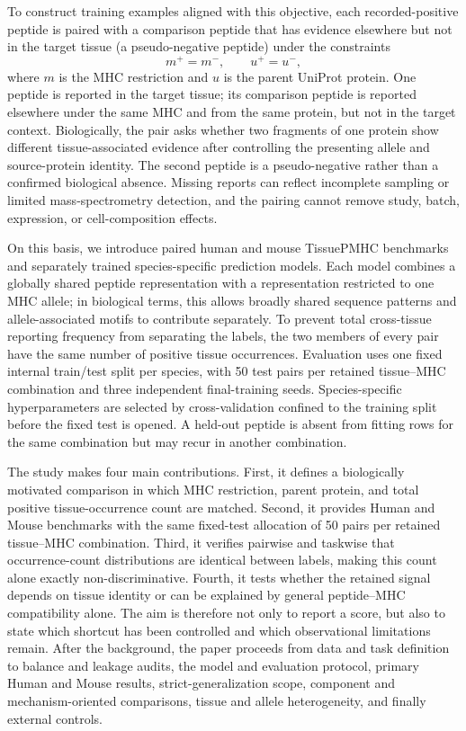 To construct training examples aligned with this objective, each recorded-positive peptide is paired with a comparison peptide that has evidence elsewhere but not in the target tissue (a pseudo-negative peptide) under the constraints
\[
m^{+}=m^{-}, \qquad u^{+}=u^{-},
\]
where \(m\) is the MHC restriction and \(u\) is the parent UniProt protein. One peptide is reported in the target tissue; its comparison peptide is reported elsewhere under the same MHC and from the same protein, but not in the target context. Biologically, the pair asks whether two fragments of one protein show different tissue-associated evidence after controlling the presenting allele and source-protein identity. The second peptide is a pseudo-negative rather than a confirmed biological absence. Missing reports can reflect incomplete sampling or limited mass-spectrometry detection, and the pairing cannot remove study, batch, expression, or cell-composition effects.

On this basis, we introduce paired human and mouse TissuePMHC benchmarks and separately trained species-specific prediction models. Each model combines a globally shared peptide representation with a representation restricted to one MHC allele; in biological terms, this allows broadly shared sequence patterns and allele-associated motifs to contribute separately. To prevent total cross-tissue reporting frequency from separating the labels, the two members of every pair have the same number of positive tissue occurrences. Evaluation uses one fixed internal train/test split per species, with 50 test pairs per retained tissue--MHC combination and three independent final-training seeds. Species-specific hyperparameters are selected by cross-validation confined to the training split before the fixed test is opened. A held-out peptide is absent from fitting rows for the same combination but may recur in another combination.

The study makes four main contributions. First, it defines a biologically motivated comparison in which MHC restriction, parent protein, and total positive tissue-occurrence count are matched. Second, it provides Human and Mouse benchmarks with the same fixed-test allocation of 50 pairs per retained tissue--MHC combination. Third, it verifies pairwise and taskwise that occurrence-count distributions are identical between labels, making this count alone exactly non-discriminative. Fourth, it tests whether the retained signal depends on tissue identity or can be explained by general peptide--MHC compatibility alone. The aim is therefore not only to report a score, but also to state which shortcut has been controlled and which observational limitations remain. After the background, the paper proceeds from data and task definition to balance and leakage audits, the model and evaluation protocol, primary Human and Mouse results, strict-generalization scope, component and mechanism-oriented comparisons, tissue and allele heterogeneity, and finally external controls.
